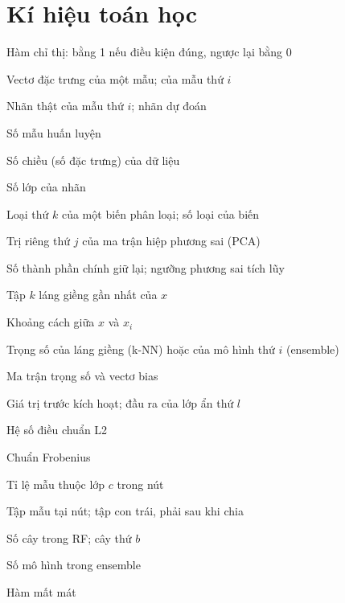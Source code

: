 \documentclass[a4paper]{report}
\begin{document}
\chapter*{Kí hiệu toán học}
\begin{tuviettat}
  \item[{$\ind[\cdot]$}] Hàm chỉ thị: bằng 1 nếu điều kiện đúng, ngược lại bằng 0
  \item[$x,\ x_i$] Vectơ đặc trưng của một mẫu; của mẫu thứ $i$
  \item[$y_i,\ \hat{y}$] Nhãn thật của mẫu thứ $i$; nhãn dự đoán
  \item[$n,\ N$] Số mẫu huấn luyện
  \item[$d$] Số chiều (số đặc trưng) của dữ liệu
  \item[$C$] Số lớp của nhãn
  \item[$c_k,\ K$] Loại thứ $k$ của một biến phân loại; số loại của biến
  \item[$\lambda_j$] Trị riêng thứ $j$ của ma trận hiệp phương sai (PCA)
  \item[$m,\ \tau$] Số thành phần chính giữ lại; ngưỡng phương sai tích lũy
  \item[$N_k(x)$] Tập $k$ láng giềng gần nhất của $x$
  \item[$d(x,x_i)$] Khoảng cách giữa $x$ và $x_i$
  \item[$w_i$] Trọng số của láng giềng (k-NN) hoặc của mô hình thứ $i$ (ensemble)
  \item[$W,\ b$] Ma trận trọng số và vectơ bias
  \item[$z,\ h^{(l)}$] Giá trị trước kích hoạt; đầu ra của lớp ẩn thứ $l$
  \item[$\lambda,\ \alpha$] Hệ số điều chuẩn L2
  \item[$\lVert\cdot\rVert_F$] Chuẩn Frobenius
  \item[$p_c$] Tỉ lệ mẫu thuộc lớp $c$ trong nút
  \item[$S,\ S_L,\ S_R$] Tập mẫu tại nút; tập con trái, phải sau khi chia
  \item[$B,\ T_b$] Số cây trong RF; cây thứ $b$
  \item[$M$] Số mô hình trong ensemble
  \item[$\mathcal{L}$] Hàm mất mát
\end{tuviettat}

\cleardoublepage{}
\listoftables
\cleardoublepage{}
\listoffigures
\end{document}
